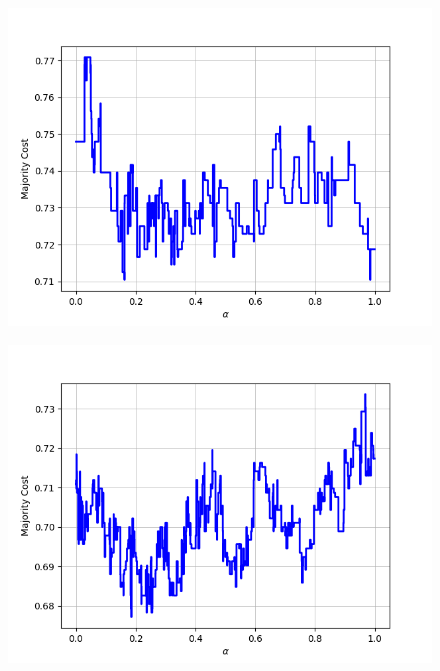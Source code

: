 \begin{figure}[h]
\begin{minipage}{.19\textwidth}
  {\includegraphics[width=\linewidth]{plots/omniglot-intra-ac-cnn/Asomtavruli_(Georgian)}}
\end{minipage}
\begin{minipage}{.19\textwidth}
  \centering
  {\includegraphics[width=\linewidth]{plots/omniglot-intra-ac-cnn/Balinese}}
\end{minipage}
\begin{minipage}{.19\textwidth}
  \centering

\end{minipage}
\end{figure}
